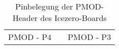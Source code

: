 \begin{table}[h]
{\begin{tabular}{lllllllclllll}
\multicolumn{6}{c}{PMOD - P4}                                                                                                                                                                                                                                                                                                                            &                       & \multicolumn{6}{c}{PMOD - P3}                                                                                                                                                                                                                                                                                                                      
\end{tabular}

}
\caption{Pinbelegung der PMOD-Header des Icezero-Boards}
\label{tbl:PMOD-Pins}
\end{table}


